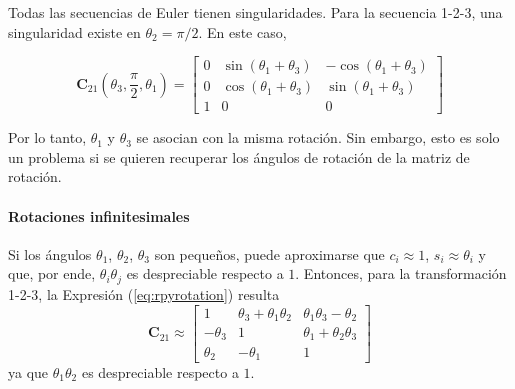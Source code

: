 Todas las secuencias de Euler tienen singularidades. Para la secuencia 1-2-3, una singularidad existe en $\theta_2 = \pi/2$. En este caso,

\begin{equation}
    \bm{C}_{21}(\theta_3,\frac{\pi}{2},\theta_1) = 
    \begin{bmatrix}
        0 & \sin{(\theta_1 + \theta_3)} & -\cos{(\theta_1 + \theta_3)} \\
        0 & \cos{(\theta_1 + \theta_3)} & \sin{(\theta_1 + \theta_3)} \\
        1 & 0 & 0
    \end{bmatrix}
\end{equation}

Por lo tanto, $\theta_1$ y $\theta_3$ se asocian con la misma rotación. Sin embargo, esto es solo un problema si se quieren recuperar los ángulos de  rotación de la matriz de rotación.

\paragraph{Rotaciones infinitesimales} Si los ángulos $\theta_1$, $\theta_2$, $\theta_3$ son pequeños, puede aproximarse que $c_i \approx 1$, $s_i \approx \theta_i$ y que, por ende, $\theta_i\theta_j$ es despreciable respecto a $1$. Entonces, para la transformación 1-2-3, la Expresión (\ref{eq:rpyrotation}) resulta
\begin{equation}
    \bm{C}_{21} \approx
    \begin{bmatrix}
        1 & \theta_3 + \theta_1\theta_2 & \theta_1\theta_3 - \theta_2 \\
        -\theta_3 & 1 & \theta_1 + \theta_2\theta_3 \\
        \theta_2 & -\theta_1 & 1
    \end{bmatrix}
    \label{eq:rpyinfinitesimal}
\end{equation}
ya que $\theta_1\theta_2$ es despreciable respecto a $1$.

